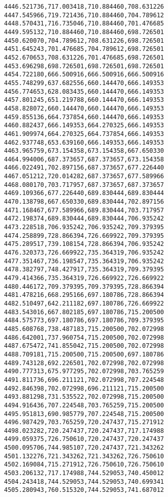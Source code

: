 \documentclass[11pt]{article}
\begin{document}
\begin{Verbatim}[commandchars=\\\{\}]
4446.521736,717.003418,710.884460,708.631226
4447.545966,719.721436,710.884460,704.789612
4448.570431,716.735046,710.884460,701.476685
4449.595132,710.884460,710.884460,698.726501
4450.620070,704.789612,708.631226,698.726501
4451.645243,701.476685,704.789612,698.726501
4452.670653,708.631226,701.476685,698.726501
4453.696298,698.726501,698.726501,698.726501
4454.722180,666.500916,666.500916,666.500916
4455.748299,637.682556,660.144470,666.149353
4456.774653,628.083435,660.144470,666.149353
4457.801245,651.219788,660.144470,666.149353
4458.828072,660.144470,660.144470,666.149353
4459.855136,664.737854,660.144470,666.149353
4460.882437,666.149353,664.270325,666.149353
4461.909974,664.270325,664.737854,666.149353
4462.937748,653.639160,666.149353,666.149353
4463.965759,673.154358,673.154358,667.650330
4464.994006,687.373657,687.373657,673.154358
4466.022491,702.897156,687.373657,677.226440
4467.051212,720.014282,687.373657,677.589966
4468.080170,703.717957,687.373657,687.373657
4469.109366,677.226440,689.830444,689.830444
4470.138798,667.650330,689.830444,702.897156
4471.168467,677.589966,689.830444,703.717957
4472.198374,689.830444,689.830444,706.935242
4473.228518,706.935242,706.935242,709.379395
4474.258899,728.866394,726.669922,709.379395
4475.289517,739.108154,728.866394,706.935242
4476.320373,726.669922,735.364319,706.935242
4477.351467,736.198547,735.364319,706.935242
4478.382797,748.427917,735.364319,709.379395
4479.414366,735.364319,726.669922,726.669922
4480.446172,709.379395,709.379395,728.866394
4481.478216,668.295166,697.180786,728.866394
4482.510497,642.211182,697.180786,726.669922
4483.543016,667.802185,697.180786,715.200500
4484.575773,697.180786,697.180786,709.379395
4485.608768,738.487183,715.200500,702.072998
4486.642001,737.960754,715.200500,702.072998
4487.675472,741.855042,715.200500,702.072998
4488.709181,715.200500,715.200500,697.180786
4489.743128,692.226501,702.072998,702.072998
4490.777313,675.977295,702.072998,703.765259
4491.811736,696.211121,702.072998,707.224548
4492.846398,702.072998,696.211121,715.200500
4493.881298,731.535522,702.072998,715.200500
4494.916436,707.224548,703.765259,715.200500
4495.951813,690.985779,707.224548,715.200500
4496.987429,703.765259,720.247437,715.271912
4498.023282,720.247437,720.247437,717.174988
4499.059375,726.750610,720.247437,720.247437
4500.095706,744.985107,720.247437,721.343262
4501.132276,721.343262,721.343262,726.750610
4502.169084,715.271912,726.750610,726.750610
4503.206132,717.174988,744.529053,740.450012
4504.243418,744.529053,744.529053,740.699341
4505.280943,760.515320,744.529053,741.687012

\end{Verbatim}
\end{document}
